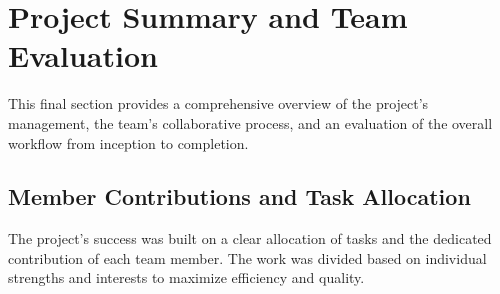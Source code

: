 \section{Project Summary and Team Evaluation}
\label{sec:team_evaluation}

This final section provides a comprehensive overview of the project's management, the team's collaborative process, and an evaluation of the overall workflow from inception to completion.

\subsection{Member Contributions and Task Allocation}
The project's success was built on a clear allocation of tasks and the dedicated contribution of each team member. The work was divided based on individual strengths and interests to maximize efficiency and quality.

